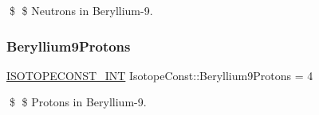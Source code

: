 \$ \$ Neutrons in Beryllium-\/9. \mbox{\label{group___isotope_const-_beryllium-_be9_ga2376597d45877e13d1c6aeefcbce5c61}} 
\subsubsection{\texorpdfstring{Beryllium9\+Protons}{Beryllium9Protons}}
{\footnotesize\ttfamily \mbox{\hyperlink{group___isotope_const-_macros_ga5f18360b3e99483a35c32d789e62621c}{I\+S\+O\+T\+O\+P\+E\+C\+O\+N\+S\+T\+\_\+\+I\+NT}} Isotope\+Const\+::\+Beryllium9\+Protons = 4}

\$ \$ Protons in Beryllium-\/9. 